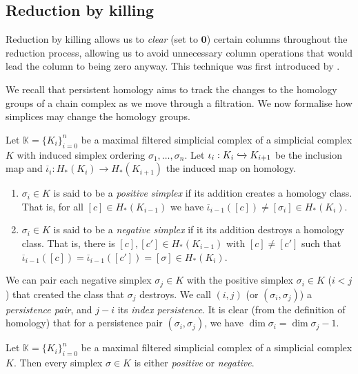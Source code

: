 \subsection{Reduction by killing}

Reduction by killing allows us to \emph{clear} (set to $\bm 0$) certain columns throughout the reduction process, allowing us to avoid unnecessary column operations that would lead the column to being zero anyway. This technique was first introduced by \textcite{chen2011persistent}.

We recall that persistent homology aims to track the changes to the homology groups of a chain complex as we move through a filtration. We now formalise how simplices may change the homology groups.

\begin{definition}
  Let $\mathbb K = \{K_i\}_{i=0}^n$ be a maximal filtered simplicial complex of a simplicial complex $K$ with induced simplex ordering $\sigma_1, \ldots, \sigma_n$. Let $\iota_i: K_i \xhookrightarrow{} K_{i+1}$ be the inclusion map and $\overline\iota_i: H_*(K_i) \to H_*(K_{i+1})$ the induced map on homology. 
  \begin{enumerate}
    \item $\sigma_i \in K$ is said to be a \emph{positive simplex} if its addition creates a homology class. That is, for all $[c] \in H_*(K_{i-1})$ we have $\overline\iota_{i-1}([c]) \neq [\sigma_i] \in H_*(K_i)$.
    \item $\sigma_i \in K$ is said to be a \emph{negative simplex} if it its addition destroys a homology class. That is, there is $[c], [c'] \in H_*(K_{i-1})$ with $[c] \neq [c']$ such that $\overline\iota_{i-1}([c]) = \overline\iota_{i-1}([c']) = [\sigma] \in H_*(K_i)$.
  \end{enumerate} 
\end{definition}

We can pair each negative simplex $\sigma_j \in K$ with the positive simplex $\sigma_i \in K$ ($i < j$) that created the class that $\sigma_j$ destroys. We call $(i, j)$ (or $(\sigma_i, \sigma_j)$) a \emph{persistence pair}, and $j - i$ its \emph{index persistence}. It is clear (from the definition of homology) that for a persistence pair $(\sigma_i, \sigma_j)$, we have $\dim\sigma_i = \dim\sigma_j - 1$. 

\begin{corollary}\label{lem:positive-or-negative-simplices}
  Let $\mathbb K = \{K_i\}_{i=0}^n$ be a maximal filtered simplicial complex of a simplicial complex $K$. Then every simplex $\sigma \in K$ is either \emph{positive} or \emph{negative}.
\end{corollary}

